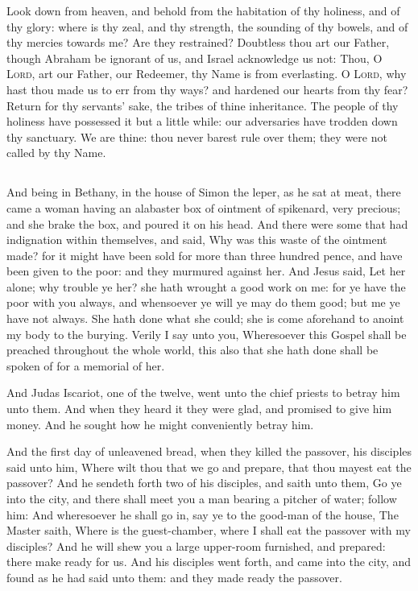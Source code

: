 Look down from heaven, and behold from the habitation of thy holiness, and of thy glory: where is thy zeal, and thy strength, the sounding of thy bowels, and of thy mercies towards me? Are they restrained? Doubtless thou art our Father, though Abraham be ignorant of us, and Israel acknowledge us not: Thou, O {\scshape Lord}, art our Father, our Redeemer, thy Name is from everlasting. O {\scshape Lord}, why hast thou made us to err from thy ways? and hardened our hearts from thy fear? Return for thy servants' sake, the tribes of thine inheritance. The people of thy holiness have possessed it but a little while: our adversaries have trodden down thy sanctuary. We are thine: thou never barest rule over them; they were not called by thy Name.


\subsection{}

And being in Bethany, in the house of Simon the leper, as he sat at meat, there came a woman having an alabaster box of ointment of spikenard, very precious; and she brake the box, and poured it on his head. And there were some that had indignation within themselves, and said, Why was this waste of the ointment made? for it might have been sold for more than three hundred pence, and have been given to the poor: and they murmured against her. And Jesus said, Let her alone; why trouble ye her? she hath wrought a good work on me: for ye have the poor with you always, and whensoever ye will ye may do them good; but me ye have not always. She hath done what she could; she is come aforehand to anoint my body to the burying. Verily I say unto you, Wheresoever this Gospel shall be preached throughout the whole world, this also that she hath done shall be spoken of for a memorial of her.

And Judas Iscariot, one of the twelve, went unto the chief priests to betray him unto them. And when they heard it they were glad, and promised to give him money. And he sought how he might conveniently betray him.

And the first day of unleavened bread, when they killed the passover, his disciples said unto him, Where wilt thou that we go and prepare, that thou mayest eat the passover? And he sendeth forth two of his disciples, and saith unto them, Go ye into the city, and there shall meet you a man bearing a pitcher of water; follow him: And wheresoever he shall go in, say ye to the good-man of the house, The Master saith, Where is the guest-chamber, where I shall eat the passover with my disciples? And he will shew you a large upper-room furnished, and prepared: there make ready for us. And his disciples went forth, and came into the city, and found as he had said unto them: and they made ready the passover.

